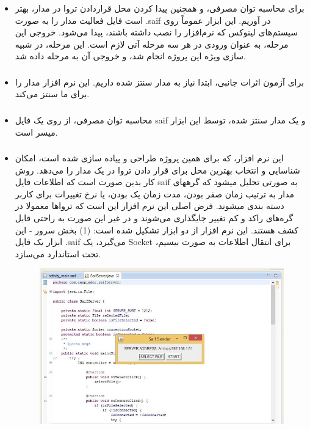 \begin{itemize}
	
	\item \subsubsection{}
	برای محاسبه توان مصرفی، و همچنین پیدا کردن محل قراردادن تروا در مدار، بهتر است فایل فعالیت مدار را به صورت .saif در آوریم. این ابزار عموماً روی سیستم‌های لینوکس که نرم‌افزار 
	را نصب داشته باشند، پیدا می‌شود.
	خروجی این مرحله، به عنوان ورودی در هر سه مرحله آتی لازم است. این مرحله، در شبیه سازی ویژه این پروژه انجام شد، و خروجی آن به مرحله
	داده شد.
	\item \subsubsection{}
	برای آزمون اثرات جانبی، ابتدا نیاز به مدار سنتز شده داریم. این نرم افزار مدار را برای ما سنتز می‌کند.
	\item \subsubsection{}
	محاسبه توان مصرفی، از روی یک فایل saif و یک مدار سنتز شده، توسط این ابزار میسر است.
	\item \subsubsection{}
	این نرم افزار، که برای همین پروژه طراحی و پیاده سازی شده است، امکان شناسایی و انتخاب بهترین محل برای قرار دادن تروا در یک مدار را می‌دهد. روش کار بدین صورت است که اطلاعات فایل saif به صورتی تحلیل میشود که گرههای مدار به ترتیب زمان صفر بودن، مدت زمان یک بودن، یا نرخ تغییرات برای کاربر دسته بندی میشوند. فرض اصلی این نرم افزار این است که ترواها معمولا در گره‌های راکد و کم تغییر جایگذاری می‌شوند و در غیر این صورت به راحتی قابل کشف هستند. این نرم افزار از دو ابزار تشکیل شده است:
	(1) بخش سرور - این ابزار یک فایل .saif می‌گیرد، یک Socket برای انتقال اطلاعات به صورت بیسیم، تحت استاندارد  می‌سازد.
	\begin{figure}
		\begin{center}
			\includegraphics[scale=0.75]{figs/saifServer.jpg}

\end{center}
\end{figure}
\end{itemize}
